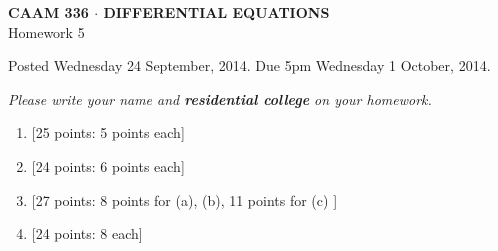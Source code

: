 \documentclass[10pt]{article}
\begin{document}
\vspace*{-5em}
\begin{center}
\large \textsf{\textbf{CAAM 336 $\cdot$ DIFFERENTIAL EQUATIONS}\\[0.5em]
Homework 5 }
\end{center}

Posted Wednesday 24 September, 2014.  Due 5pm Wednesday 1 October, 2014.
\begin{center}
\emph{Please write your name and \textbf{residential college} on your homework.}
\end{center}

\begin{enumerate}
\item {[25 points: 5 points each]}\\  
\newpage
\item {[24 points: 6 points each]}\\  
\newpage
\item {[27 points: 8 points for (a), (b), 11 points for (c) ]}\\  
\newpage
\item {[24 points: 8 each]}\\   


\end{enumerate}
\end{document}

